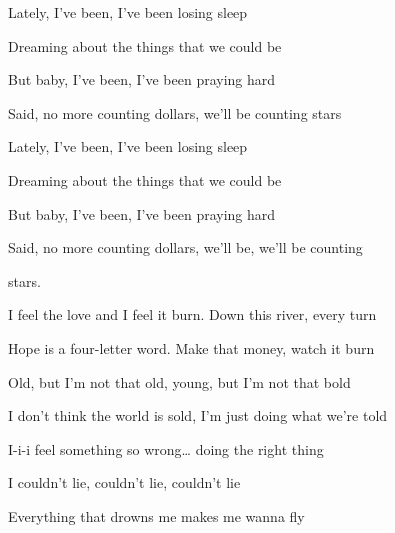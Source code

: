 \begin{song}
\begin{chorusbox}{\Chorus}
Lately, I've been, I've been losing sleep \par
{} Dreaming about the things that we could be \par
But baby, I've been, I've been praying hard \par
{} Said, no more counting dollars, we'll be counting stars \par

\bigskip

Lately, I've been, I've been losing sleep \par
{} Dreaming about the things that we could be \par
But baby, I've been, I've been praying hard \par
{} Said, no more counting dollars, we'll be, we'll be counting \par
\end{chorusbox}

\bigskip

stars.    \par

\bigskip

I feel the love and I feel it burn. Down this river, every turn \par
{}Hope is a four-letter word. Make that money, watch it burn \par
{}Old, but I'm not that old, young, but I'm not that bold \par
{}I don't think the world is sold, I'm just doing what we're told \par

\bigskip

 I-i-i feel something so wrong… doing the right thing \par
{} I couldn't lie, couldn't lie, couldn't lie \par
{}Everything that drowns me makes me wanna fly \par

\bigskip

\Chorus

\bigskip



\end{song}
